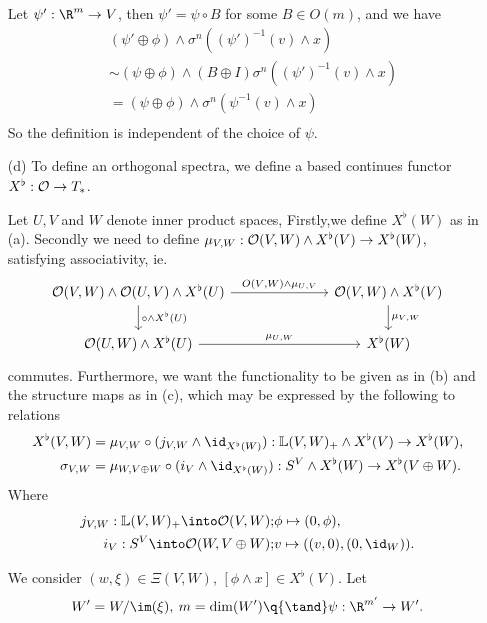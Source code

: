 \begin{exercise}[2]
\begin{enumerate}
Let $\psi' : \R^m \to V$, then $\psi' = \psi \circ B$ for some $B \in O(m)$, and
we have
\begin{align*}
&(\psi' \oplus \phi) \wedge \sigma^n ((\psi')^{-1}(v) \wedge x) \\
&\sim (\psi \oplus \phi) \wedge (B \oplus I)\sigma^n ((\psi')^{-1}(v) \wedge x) \\
&= (\psi \oplus \phi) \wedge \sigma^n (\psi^{-1}(v) \wedge x) \\
\end{align*}
So the definition is independent of the choice of $\psi$.

\item[(d)]
To define an orthogonal spectra, we define a based continues functor $X^\flat :
\mathcal{O} \to T_*$. 


Let $U, V$ and $W$ denote inner product spaces, 
Firstly,we define $X^\flat (W)$ as in (a). Secondly we need to define 
$\mu_{V,W}: \mathcal{O}(V, W) \wedge X^\flat(V) \to X^\flat(W)$, satisfying
associativity, ie. 
\[ \begin{tikzcd}[column sep = 7em]
\O(V, W) \wedge \O(U,V) \wedge X^\flat(U) 
\arrow[r, "O(V{,}W) \wedge \mu_{U{,}V}"] 
\arrow[d, "\circ \wedge X^\flat(U)"] 
& \O(V, W) \wedge X^\flat(V) 
\arrow[d, "\mu_{V{,}W}"] \\ 
\O(U,W) \wedge X^\flat(U) 
\arrow[r, "\mu_{U{,}W}"] 
& X^\flat(W)
\end{tikzcd} \]
commutes. Furthermore, we want the functionality to be given as in (b) and the
structure maps as in (c), which may be expressed by the following to relations
\begin{equation}
\begin{split}
X^\flat(V,W) &= \mu_{V, W} \circ (j_{V,W} \wedge \id_{X^\flat(W)}) : 
\L(V, W)_+ \wedge X^\flat (V) \to X^\flat(W),
\\
\sigma_{V,W} &= \mu_{W,V\oplus W} \circ (i_V \wedge \id_{X^\flat(W)}) :
S^V \wedge X^\flat (W) \to X^\flat(V \oplus W).
\end{split}
\end{equation}
Where 
\begin{align*}
j_{V,W} : \L(V,W)_+ \into \O(V,W); & \phi \mapsto (0,\phi), \\
i_V : S^V \into \O(W, V\oplus W); & v \mapsto ((v,0), (0,\id_W)).
\end{align*}


We consider $(w, \xi) \in \Xi(V,W)$, $[\phi \wedge x] \in X^\flat(V)$. Let 
\[ W' = W/\im(\xi), \: m = \dim(W') \q{\tand} \psi : \R^{m'} \to W'. \]


\end{enumerate}
\end{exercise}
